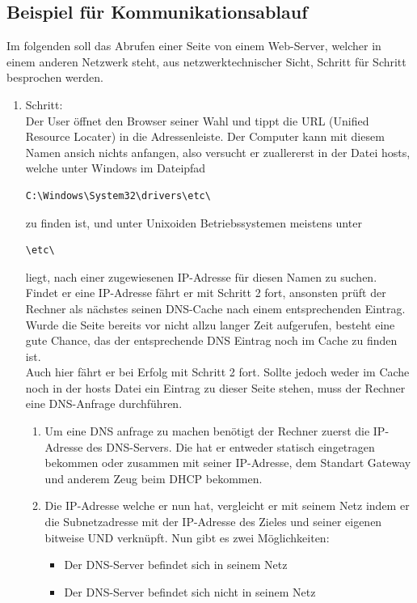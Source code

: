 \documentclass[11pt,a4paper]{report}
\begin{document}
\subsection{Beispiel für Kommunikationsablauf}
Im folgenden soll das Abrufen einer Seite von einem Web-Server, welcher in einem anderen Netzwerk steht, aus netzwerktechnischer Sicht, Schritt für Schritt besprochen werden.\\
\begin{enumerate}
\item Schritt:\\
Der User öffnet den Browser seiner Wahl und tippt die URL (Unified Resource Locater) in die Adressenleiste. Der Computer kann mit diesem Namen ansich nichts anfangen, also versucht er zuallererst in der Datei \glqq hosts\grqq , welche unter Windows im Dateipfad
\begin{lstlisting} 
C:\Windows\System32\drivers\etc\ 
\end{lstlisting} zu finden ist, und unter Unixoiden Betriebssystemen meistens unter 
\begin{lstlisting} 
\etc\ 
\end{lstlisting} liegt, nach einer zugewiesenen IP-Adresse für diesen Namen zu suchen.\\
Findet er eine IP-Adresse fährt er mit Schritt 2 fort, ansonsten prüft der Rechner als nächstes seinen DNS-Cache nach einem entsprechenden Eintrag. Wurde die Seite bereits vor nicht allzu langer Zeit aufgerufen, besteht eine gute Chance, das der entsprechende DNS Eintrag noch im Cache zu finden ist.\\
Auch hier fährt er bei Erfolg mit Schritt 2 fort. Sollte jedoch weder im Cache noch in der hosts Datei ein Eintrag zu dieser Seite stehen, muss der Rechner eine DNS-Anfrage durchführen.\\
\begin{enumerate}
\item Um eine DNS anfrage zu machen benötigt der Rechner zuerst die IP-Adresse des DNS-Servers. Die hat er entweder statisch eingetragen bekommen oder zusammen mit seiner IP-Adresse, dem Standart Gateway und anderem Zeug beim DHCP bekommen.
\item Die IP-Adresse welche er nun hat, vergleicht er mit seinem Netz indem er die Subnetzadresse mit der IP-Adresse des Zieles und seiner eigenen bitweise UND verknüpft. Nun gibt es zwei Möglichkeiten: 
\begin{itemize}
\item Der DNS-Server befindet sich in seinem Netz
\item Der DNS-Server befindet sich nicht in seinem Netz

\end{itemize}
\end{enumerate}
\end{enumerate}
\end{document}
